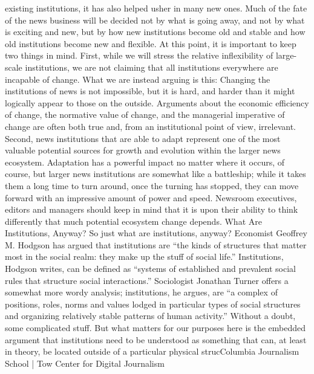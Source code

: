 existing institutions, it has also helped usher in many new ones. Much of the fate
of the news business will be decided not by what is going away, and not by what
is exciting and new, but by how new institutions become old and stable and how
old institutions become new and flexible.
At this point, it is important to keep two things in mind. First, while we will
stress the relative inflexibility of large-scale institutions, we are not claiming that
all institutions everywhere are incapable of change. What we are instead arguing
is this: Changing the institutions of news is not impossible, but it is hard, and
harder than it might logically appear to those on the outside. Arguments about
the economic efficiency of change, the normative value of change, and the
managerial imperative of change are often both true and, from an institutional
point of view, irrelevant.
Second, news institutions that are able to adapt represent one of the most valuable
potential sources for growth and evolution within the larger news ecosystem.
Adaptation has a powerful impact no matter where it occurs, of course,
but larger news institutions are somewhat like a battleship; while it takes them a
long time to turn around, once the turning has stopped, they can move forward
with an impressive amount of power and speed. Newsroom executives, editors
and managers should keep in mind that it is upon their ability to think differently
that much potential ecosystem change depends.
What Are Institutions, Anyway?
So just what are institutions, anyway? Economist Geoffrey M. Hodgson has
argued that institutions are ``the kinds of structures that matter most in the social
realm: they make up the stuff of social life.'' Institutions, Hodgson writes, can be
defined as ``systems of established and prevalent social rules that structure social
interactions.'' Sociologist Jonathan Turner offers a somewhat more wordy analysis;
institutions, he argues, are ``a complex of positions, roles, norms and values
lodged in particular types of social structures and organizing relatively stable patterns
of human activity.''
Without a doubt, some complicated stuff. But what matters for our purposes
here is the embedded argument that institutions need to be understood as something
that can, at least in theory, be located outside of a particular physical strucColumbia
Journalism School | Tow Center for Digital Journalism

